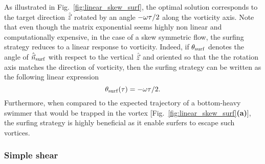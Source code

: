 As illustrated in Fig.~\ref{fig:linear_skew_surf}, the optimal solution corresponds to the target direction $\hat{\vec{z}}$ rotated by an angle $-\omega \tau/2$ along the vorticity axis.
Note that even though the matrix exponential seems highly non linear and computationally expensive, in the case of a skew symmetric flow, the surfing strategy reduces to a linear response to vorticity.
Indeed, if $\theta_{\mathrm{surf}}$ denotes the angle of $\hat{\vec{n}}_{\mathrm{surf}}$ with respect to the vertical $\hat{\vec{z}}$ and oriented so that the the rotation axis matches the direction of vorticity, then the surfing strategy can be written as the following linear expression
\begin{equation}
	\theta_{\mathrm{surf}}(\tau) = -\omega \tau/2.
\end{equation}
Furthermore, when compared to the expected trajectory of a bottom-heavy swimmer that would be trapped in the vortex [Fig.~\ref{fig:linear_skew_surf}\textbf{(a)}], the surfing strategy is highly beneficial as it enable surfers to escape such vortices.

\subsubsection{Simple shear}

